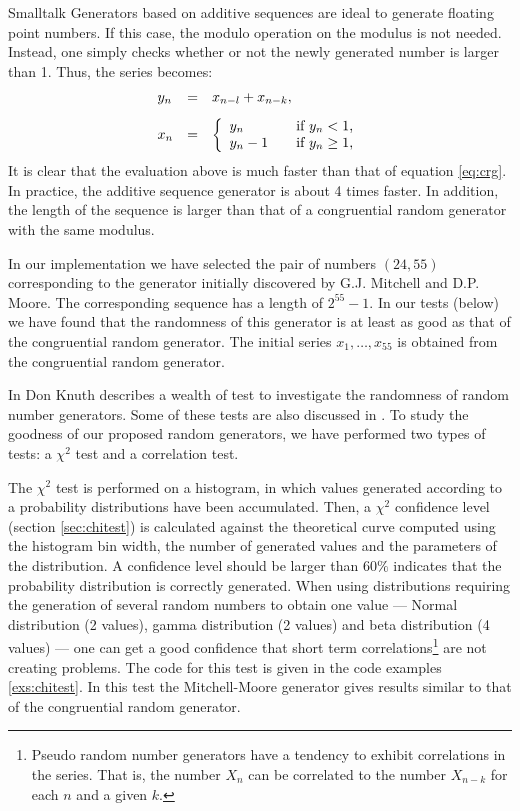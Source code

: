 \begin{displaycode}{Smalltalk}
Generators based on additive sequences are ideal to generate
floating point numbers. If this case, the modulo operation on the
modulus is not needed. Instead, one simply checks whether or not
the newly generated number is larger than 1. Thus, the series
becomes:
\begin{equation}
\label{eq:addseqrandom}
  \begin{array}{lcl}
  y_n&=&x_{n-l}+x_{n-k},\\*[2ex]
  x_n&=&\left\{
    \begin{array}{ll}
    y_n&\mbox{\quad if $y_n<1$,}\\
    y_n-1&\mbox{\quad if $y_n\geq 1$,}\\
    \end{array}
  \right.
  \end{array}
\end{equation}
It is clear that the evaluation above is much faster than that of
equation \ref{eq:crg}. In practice, the additive sequence
generator is about 4 times faster. In addition, the length of the
sequence is larger than that of a  congruential random generator
with the same modulus.

In our implementation we have selected the pair of numbers
$\left(24,55\right)$ corresponding to the generator initially
discovered by G.J. Mitchell and D.P. Moore\cite{Knuth2}. The
corresponding sequence has a length of $2^{55}-1$. In our tests
(\cf below) we have found that the randomness of this generator is
at least as good as that of the congruential random generator. The
initial series $x_1,\ldots,x_{55}$ is obtained from the
congruential random generator.

In \cite{Knuth2} Don Knuth describes a wealth of test to
investigate the randomness of random number generators. Some of
these tests are also discussed in \cite{LawKel}. To study the
goodness of our proposed random generators, we have performed two
types of tests: a $\chi^2$ test and a correlation test.

The $\chi^2$ test is performed on a histogram, in which values
generated according to a probability distributions have been
accumulated. Then, a $\chi^2$ confidence level (\cf section
\ref{sec:chitest}) is calculated against the theoretical curve
computed using the histogram bin width, the number of generated
values and the parameters of the distribution. A confidence level
should be larger than $60\%$ indicates that the probability
distribution is correctly generated. When using distributions
requiring the generation of several random numbers to obtain one
value --- Normal distribution (2 values), gamma distribution (2
values) and beta distribution (4 values)
--- one can get a good confidence that short term
correlations\footnote{Pseudo random number generators have a
tendency to exhibit correlations in the series. That is, the
number $X_n$ can be correlated to the number $X_{n-k}$ for each
$n$ and a given $k$.} are not creating problems. The code for this
test is given in the code examples \ref{exs:chitest}. In this test the Mitchell-Moore
generator gives results similar to that of the congruential random
generator.


\end{displaycode}
